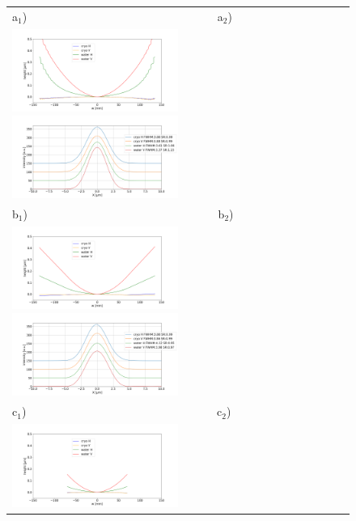 \documentclass[preprint]{iucr}              %
\begin{document}
   \begin{figure}
   \label{fig:intensitycorrected} 
   \begin{center}
   \begin{tabular}{l} 
  a$_1$)~~~~~~~~~~~~~~~~~~~~~~~~~~~~~~~~~
  a$_2$)\\

    \includegraphics[width=0.5\textwidth]{figures/correctionprofiles.png}
    \includegraphics[width=0.5\textwidth]{figures/intensitycorrected.png} \\ 
  b$_1$)~~~~~~~~~~~~~~~~~~~~~~~~~~~~~~~~~
  b$_2$)\\
   \includegraphics[width=0.5\textwidth]{figures/correctionprofilesextrapolated.png}
   \includegraphics[width=0.5\textwidth]{figures/intensitycorrectedextrapolated.png} \\   
  c$_1$)~~~~~~~~~~~~~~~~~~~~~~~~~~~~~~~~~
  c$_2$)\\
   \includegraphics[width=0.5\textwidth]{figures/correctionprofilescropped.png}

\end{tabular}
\end{center}
\end{figure}
\end{document}
